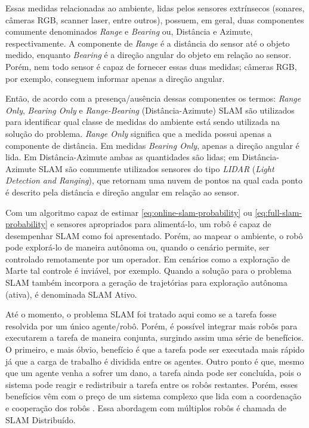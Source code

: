 Essas medidas relacionadas ao ambiente, lidas pelos sensores extrínsecos 
(sonares, câmeras RGB, scanner laser, entre outros), possuem, em geral, duas 
componentes comumente denominados \textit{Range} e \textit{Bearing} ou, Distância e Azimute, respectivamente. 
A componente de \textit{Range} é a distância do sensor até o objeto medido, 
enquanto \textit{Bearing} é a direção angular do objeto em relação ao sensor. 
Porém, nem todo sensor é capaz de fornecer essas duas medidas; câmeras RGB, por 
exemplo, conseguem  informar apenas a direção angular.

Então, de acordo com a presença/ausência dessas componentes os termos: 
\textit{Range Only}, \textit{Bearing Only} e \textit{Range-Bearing} (Distância-Azimute) SLAM são 
utilizados para identificar qual classe de medidas do ambiente está sendo
utilizada na solução do problema. \textit{Range Only} significa que a medida 
possui apenas a 
componente de distância. Em medidas \textit{Bearing Only}, apenas a direção 
angular é lida. Em Distância-Azimute ambas as quantidades são lidas; em 
Distância-Azimute SLAM são comumente utilizados sensores do tipo 
\emph{LIDAR} (\textit{Light Detection and Ranging}), que retornam uma nuvem de 
pontos na qual cada ponto é descrito pela distância e direção angular em relação ao 
sensor.

Com um algoritmo capaz de estimar \ref{eq:online-slam-probability} ou 
\ref{eq:full-slam-probability} e sensores apropriados para alimentá-lo, 
um robô é capaz de desempenhar SLAM como foi apresentado. Porém, ao mapear 
o ambiente, o robô pode explorá-lo de maneira autônoma ou, quando 
o cenário permite, ser controlado remotamente por um operador. Em cenários 
como a exploração de Marte tal controle é inviável, por exemplo. Quando a 
solução para o problema SLAM também incorpora a geração de trajetórias para exploração autônoma (ativa), é denominada SLAM Ativo.

Até o momento, o problema SLAM foi tratado aqui como se a tarefa fosse resolvida 
por um único agente/robô. Porém, é possível integrar mais robôs para executarem 
a tarefa de maneira conjunta, surgindo assim uma série de benefícios. O primeiro, 
e mais óbvio, benefício é que a tarefa pode ser executada mais rápido já que a 
carga de trabalho é dividida entre os agentes. Outro ponto é que, mesmo que um 
agente venha a sofrer um dano, a tarefa ainda pode ser concluída, pois o sistema 
pode reagir e redistribuir a tarefa entre os robôs restantes. Porém, esses 
benefícios vêm com o preço de um sistema complexo que lida com a 
coordenação e cooperação dos robôs \cite{saeedi2016multiple}. Essa abordagem com 
múltiplos robôs é chamada de SLAM Distribuído.

